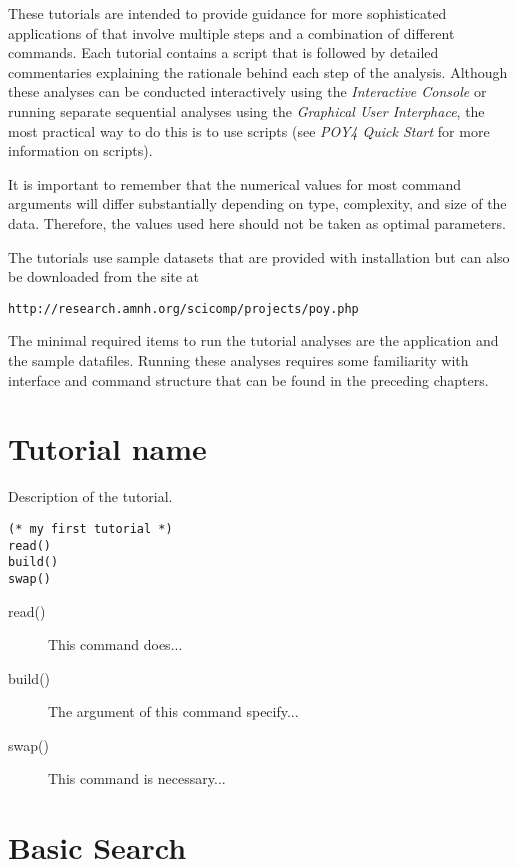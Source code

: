 These tutorials are intended to provide guidance for more sophisticated applications of \poy that involve multiple steps and a combination of different commands. Each tutorial contains a \poy script that is followed by detailed commentaries explaining the rationale behind each step of the analysis. Although these analyses can be conducted interactively using the \emph{Interactive Console} or running separate sequential analyses using the \emph{Graphical User Interphace}, the most practical way to do this is to use \poy scripts (see \emph{ POY4 Quick Start} for more information on \poy scripts).

It is important to remember that the numerical values for most command arguments will differ substantially depending on type, complexity, and size of the data. Therefore, the values used here should not be taken as optimal parameters.

The tutorials use sample datasets that are provided with \poy installation but can also be downloaded from the \poy site at
\begin{center}
\texttt{http://research.amnh.org/scicomp/projects/poy.php}
\end{center}
The minimal required items to run the tutorial analyses are the \poy application and the sample datafiles. Running these analyses requires some familiarity with \poy interface and command structure that can be found in the preceding chapters.

\section{Tutorial name}
Description of the tutorial.

\begin{verbatim}
(* my first tutorial *)
read()
build()
swap()
\end{verbatim}

\begin{description}
\item[read()] This command does...
\item[build()] The argument of this command specify...
\item[swap()] This command is necessary... 
\end{description}

\section{Basic Search}{\label{tutorial2}}

